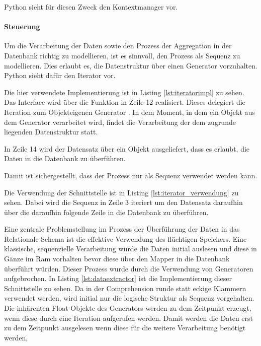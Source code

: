 Python sieht für diesen Zweck den Kontextmanager vor.




\paragraph{Steuerung}

Um die Verarbeitung der Daten sowie den Prozess der Aggregation in der Datenbank richtig zu modellieren, ist es sinnvoll, den Prozess als Sequenz zu modellieren. Dies erlaubt es, die Datenstruktur über einen Generator vorzuhalten. Python sieht dafür den Iterator vor.

Die hier verwendete Implementierung ist in Listing \ref{lst:iteratorimpl} zu sehen. Das Interface wird über die Funktion  in Zeile 12 realisiert. 
Dieses delegiert die Iteration zum Objekteigenen Generator . In dem Moment, in dem ein Objekt aus dem Generator verarbeitet wird, findet die Verarbeitung der dem zugrunde liegenden Datenstruktur statt.

In Zeile 14 wird der Datensatz über ein Objekt ausgeliefert, dass es erlaubt, die Daten in die Datenbank zu überführen.

Damit ist sichergestellt, dass der Prozess nur als Sequenz verwendet werden kann.


Die Verwendung der Schnittstelle ist in Listing \ref{lst:iterator_verwendung} zu sehen. Dabei wird die Sequenz in Zeile 3 iteriert um den Datensatz daraufhin über die daraufhin folgende Zeile in die Datenbank zu überführen.

    
    
    
Eine zentrale Problemstellung im Prozess der Überführung der Daten in das Relationale Schema ist die effektive Verwendung des flüchtigen Speichers. Eine klassische, sequenzielle Verarbeitung würde die Daten initial auslesen und diese in Gänze im Ram vorhalten bevor diese über den Mapper in die Datenbank überführt würden. Dieser Prozess wurde durch die Verwendung von Generatoren aufgebrochen. In Listing \ref{lst:dataextractor} ist die Implementierung dieser Schnittstelle zu sehen. Da in der Comprehension runde statt eckige Klammern verwendet werden, wird initial nur die logische Struktur als Sequenz vorgehalten. Die inhärenten Float-Objekte des Generators werden zu dem Zeitpunkt erzeugt, wenn diese durch eine Iteration aufgerufen werden. Damit werden die Daten erst zu dem Zeitpunkt ausgelesen wenn diese für die weitere Verarbeitung benötigt werden,
    


